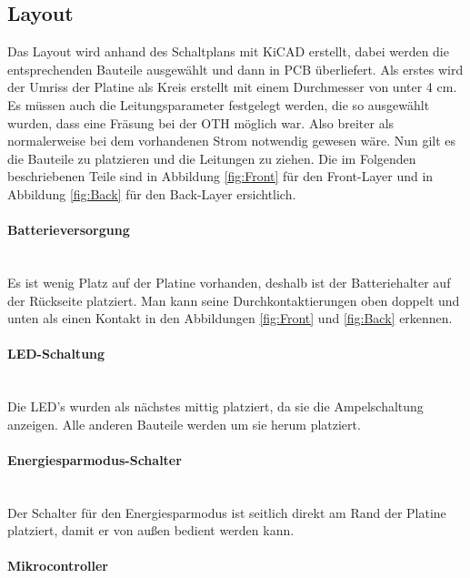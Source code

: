 \documentclass[a4paper,
DIV=13,
12pt,
BCOR=10mm,
department=FakEI,
parskip=half,
automark,
]{article}
\begin{document}
\newpage

\subsection{Layout}

Das Layout wird anhand des Schaltplans mit KiCAD erstellt, dabei werden die entsprechenden Bauteile ausgewählt und dann in PCB überliefert. Als erstes wird der Umriss der Platine als Kreis erstellt mit einem Durchmesser von unter 4 cm. Es müssen auch die Leitungsparameter festgelegt werden, die so ausgewählt wurden, dass eine Fräsung bei der OTH möglich war. Also breiter als normalerweise bei dem vorhandenen Strom notwendig gewesen wäre. Nun gilt es die Bauteile zu platzieren und die Leitungen zu ziehen. Die im Folgenden beschriebenen Teile sind in Abbildung \ref{fig:Front} für den Front-Layer und in Abbildung \ref{fig:Back} für den Back-Layer ersichtlich.

\paragraph{Batterieversorgung} $~$ \\

Es ist wenig Platz auf der Platine vorhanden, deshalb ist der Batteriehalter auf der Rückseite platziert. Man kann seine Durchkontaktierungen oben doppelt und unten als einen Kontakt in den Abbildungen \ref{fig:Front} und \ref{fig:Back} erkennen. 

\paragraph{LED-Schaltung} $~$ \\

Die LED's wurden als nächstes mittig platziert, da sie die Ampelschaltung anzeigen. Alle anderen Bauteile werden um sie herum platziert.

\paragraph{Energiesparmodus-Schalter} $~$ \\

Der Schalter für den Energiesparmodus ist seitlich direkt am Rand der Platine platziert, damit er von außen bedient werden kann. 

\paragraph{Mikrocontroller} $~$ \\
\end{document}

